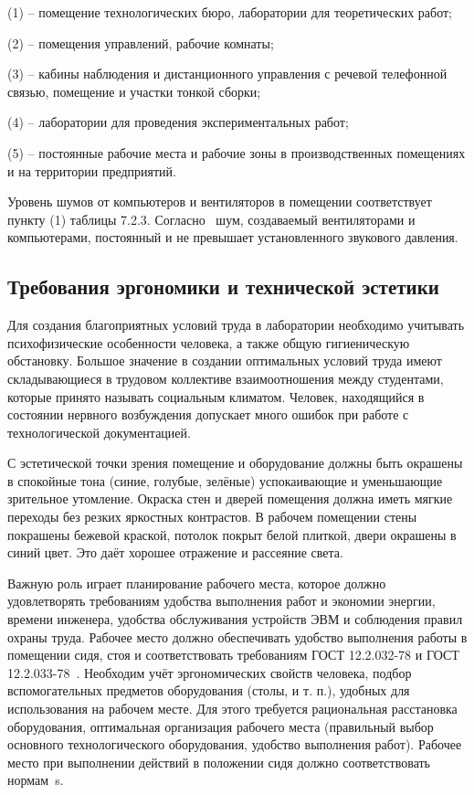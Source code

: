 (1) – помещение технологических бюро, лаборатории для теоретических работ;

(2) – помещения управлений, рабочие комнаты;

(3) – кабины наблюдения и дистанционного управления с речевой телефонной связью, помещение и участки тонкой сборки;

(4) – лаборатории для проведения экспериментальных работ;

(5) – постоянные рабочие места и рабочие зоны в производственных помещениях и на территории предприятий.

Уровень шумов от компьютеров и вентиляторов в помещении соответствует пункту (1) таблицы 7.2.3. Согласно~\cite{gost_sec_ergo_33} шум, создаваемый вентиляторами и компьютерами, постоянный и не превышает установленного звукового давления.

\subsection{Требования эргономики и технической эстетики}
Для создания благоприятных условий труда в лаборатории необходимо учитывать психофизические особенности человека, а также общую гигиеническую обстановку. Большое значение в создании оптимальных условий труда имеют складывающиеся в трудовом коллективе взаимоотношения между студентами, которые принято называть социальным климатом. Человек, находящийся в состоянии нервного возбуждения допускает много ошибок при работе с технологической документацией.

С эстетической точки зрения помещение и оборудование должны быть окрашены в спокойные тона (синие, голубые, зелёные) успокаивающие и уменьшающие зрительное утомление. Окраска стен и дверей помещения должна иметь мягкие переходы без резких яркостных контрастов. В рабочем помещении стены покрашены бежевой краской, потолок покрыт белой плиткой, двери окрашены в синий цвет. Это даёт хорошее отражение и рассеяние света.

Важную роль играет планирование рабочего места, которое должно удовлетворять требованиям удобства выполнения работ и экономии энергии, времени инженера, удобства обслуживания устройств ЭВМ и соблюдения правил охраны труда. Рабочее место должно обеспечивать удобство выполнения работы в помещении сидя, стоя и соответствовать требованиям ГОСТ 12.2.032-78\cite{gost_sec_ergonom_32} и ГОСТ 12.2.033-78~\cite{gost_sec_ergo_33}. Необходим учёт эргономических свойств человека, подбор вспомогательных предметов оборудования (столы, и т. п.), удобных для использования на рабочем месте. Для этого требуется рациональная расстановка оборудования, оптимальная организация рабочего места (правильный выбор основного технологического оборудования, удобство выполнения работ). Рабочее место при выполнении действий в положении сидя должно соответствовать нормам~\cite{gost_sec_ergonom_32}s.

